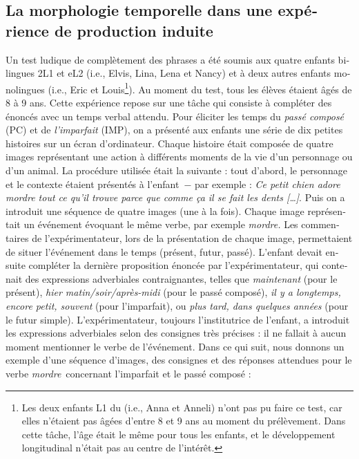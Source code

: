 \documentclass[french, output=paper]{langscibook}
\begin{document}
\begin{otherlanguage}{french}
\subsection{La morphologie temporelle dans une expérience de production induite}\label{sec:kihlstedt:4.4}\largerpage

Un test ludique de complètement des phrases a été soumis aux quatre enfants bilingues 2L1 et eL2 (i.e., Elvis, Lina, Lena et Nancy) et à deux autres enfants monolingues (i.e., Eric et Louis\footnote{Les deux enfants L1 du  (i.e., Anna et Anneli) n’ont pas pu faire ce test, car elles n’étaient pas âgées d’entre 8 et 9 ans au moment du prélèvement. Dans cette tâche, l’âge était le même pour tous les enfants, et le développement longitudinal n’était pas au centre de l’intérêt.}). Au moment du test, tous les élèves étaient âgés de 8 à 9 ans. Cette expérience repose sur une tâche qui consiste à compléter des énoncés avec un temps verbal attendu. Pour éliciter les temps du \textit{passé composé} (PC) et de \textit{l’imparfait} (IMP), on a présenté aux enfants une série de dix petites histoires sur un écran d’ordinateur. Chaque histoire était composée de quatre images représentant une action à différents moments de la vie d’un personnage ou d’un animal. La procédure utilisée était la suivante : tout d’abord, le personnage et le contexte étaient présentés à l’enfant~$-$ par exemple : \textit{Ce petit chien adore mordre tout ce qu’il trouve parce que comme ça il se fait les dents […]}. Puis on a introduit une séquence de quatre images (une à la fois). Chaque image représentait un événement évoquant le même verbe, par exemple \textit{mordre.} Les commentaires de l’expérimentateur, lors de la présentation de chaque image, permettaient de situer l’événement dans le temps (présent, futur, passé). L’enfant devait ensuite compléter la dernière proposition énoncée par l’expérimentateur, qui contenait des expressions adverbiales contraignantes, telles que \textit{maintenant} (pour le présent), \textit{hier matin/soir/après-midi} (pour le passé composé), \textit{il y a longtemps, encore petit, souvent} (pour l’imparfait), ou \textit{plus tard, dans quelques années} (pour le futur simple). L’expérimentateur, toujours l’institutrice de l’enfant, a introduit les expressions adverbiales selon des consignes très précises : il ne fallait à aucun moment mentionner le verbe de l’événement. Dans ce qui suit, nous donnons un exemple d’une séquence d’images, des consignes et des réponses attendues pour le verbe \textit{mordre}~concernant l’imparfait et le passé composé :



\end{otherlanguage}
\end{document}
